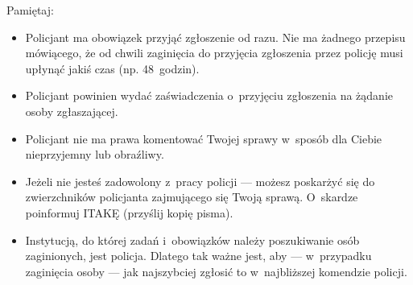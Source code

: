 \documentclass[a5paper,10pt,titlepage,twoside]{article}
\begin{document}
\begin{description}
Pamiętaj:
\begin{itemize}
\item Policjant ma obowiązek przyjąć zgłoszenie od razu. Nie ma żadnego przepisu mówiącego, że od chwili zaginięcia do przyjęcia zgłoszenia przez policję musi upłynąć jakiś czas (np. 48~godzin).
\item Policjant powinien wydać zaświadczenia o~przyjęciu zgłoszenia na żądanie osoby zgłaszającej.
\item Policjant nie ma prawa komentować Twojej sprawy w~sposób dla Ciebie nieprzyjemny lub obraźliwy.
\item Jeżeli nie jesteś zadowolony z~pracy policji --- możesz poskarżyć się do zwierzchników policjanta zajmującego się Twoją sprawą. O~skardze poinformuj ITAKĘ (przyślij kopię pisma).
\item Instytucją, do której zadań i~obowiązków należy poszukiwanie osób zaginionych, jest policja. Dlatego tak ważne jest, aby --- w~przypadku zaginięcia osoby --- jak najszybciej zgłosić to w~najbliższej komendzie policji.
\end{itemize}
\end{description}
\end{document}
